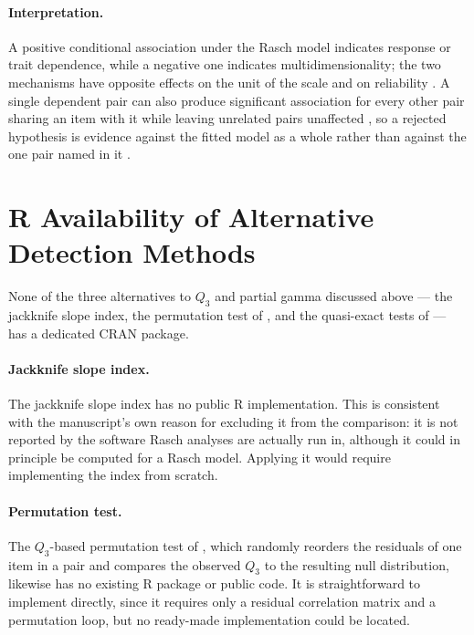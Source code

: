 \documentclass{article}
\begin{document}
\paragraph{Interpretation.}
A positive conditional association under the Rasch model indicates response or trait dependence,
while a negative one indicates multidimensionality; the two mechanisms have opposite effects on
the unit of the scale and on reliability \citep{maraisandrich2008}. A single dependent pair can
also produce significant association for every other pair sharing an item with it while leaving
unrelated pairs unaffected \citep{kreinerchristensen2011}, so a rejected hypothesis is evidence
against the fitted model as a whole rather than against the one pair named in it
\citep{kreiner1987}.

\section{R Availability of Alternative Detection Methods}

None of the three alternatives to $Q_3$ and partial gamma discussed above --- the jackknife slope
index, the permutation test of \citet{finchjeffers2016}, and the quasi-exact tests of
\citet{debelakkoller2020} --- has a dedicated CRAN package.

\paragraph{Jackknife slope index.}
The jackknife slope index \citep{houtsedwards2013,edwards2018} has no public R implementation.
This is consistent with the manuscript's own reason for excluding it from the comparison: it is
not reported by the software Rasch analyses are actually run in, although it could in principle
be computed for a Rasch model. Applying it would require implementing the index from scratch.

\paragraph{Permutation test.}
The $Q_3$-based permutation test of \citet{finchjeffers2016}, which randomly reorders the
residuals of one item in a pair and compares the observed $Q_3$ to the resulting null
distribution, likewise has no existing R package or public code. It is straightforward to
implement directly, since it requires only a residual correlation matrix and a permutation loop,
but no ready-made implementation could be located.
\end{document}
